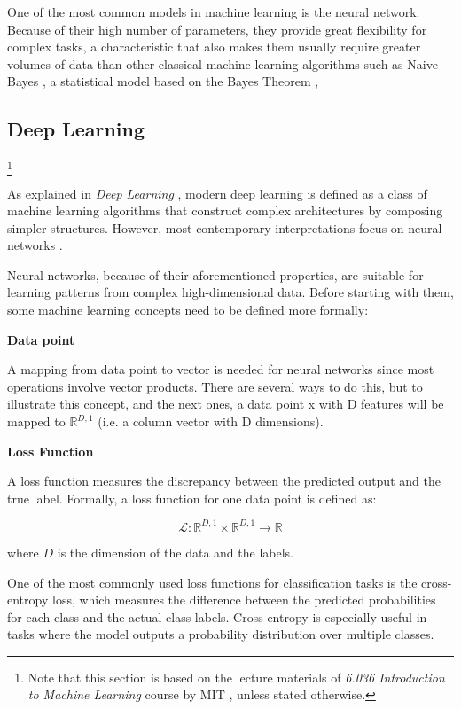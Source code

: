    One of the most common models in machine learning is the neural network. Because of their high number of parameters, they provide great flexibility for complex tasks, a characteristic that also makes them usually require greater volumes of data than other classical machine learning algorithms such as Naive Bayes \cite{osisanwo2017supervised}, a statistical model based on the Bayes Theorem \cite{webb2010naive},

\subsection{Deep Learning}
\footnote{
Note that this section is based on the lecture materials of \textit{6.036 Introduction to Machine Learning} course by MIT \cite{MITx6.036}, unless stated otherwise.}

As explained in \textit{Deep Learning} \cite{goodfellow2016deep}, modern deep learning is defined as a class of machine learning algorithms that construct complex architectures by composing simpler structures. However, most contemporary interpretations focus on neural networks \cite{goodfellow2016deep}.
     
    Neural networks, because of their aforementioned properties, are suitable for learning patterns from complex high-dimensional data. Before starting with them, some machine learning concepts need to be defined more formally:

    \textbf{Data point}

    A mapping from data point to vector is needed for neural networks since most operations involve vector products. There are several ways to do this, but to illustrate this concept, and the next ones, a data point x with D features will be mapped to ${\mathbb{R} ^ {D, 1}}$ (i.e. a column vector with D dimensions).

    \textbf{Loss Function}

A loss function measures the discrepancy between the predicted output and the true label. Formally, a loss function for one data point is defined as:

\begin{equation}
    \mathcal{L}: \mathbb{R}^{D, 1} \times \mathbb{R}^{D, 1} \rightarrow \mathbb{R}
\end{equation}

where \( D \) is the dimension of the data and the labels.

One of the most commonly used loss functions for classification tasks is the cross-entropy loss, which measures the difference between the predicted probabilities for each class and the actual class labels. Cross-entropy is especially useful in tasks where the model outputs a probability distribution over multiple classes.

